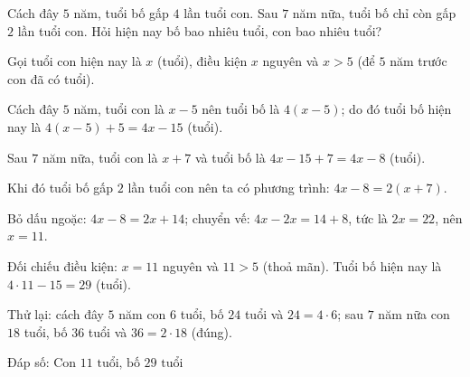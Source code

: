 \begin{problem}[8DS-PT1-044]
Cách đây $5$ năm, tuổi bố gấp $4$ lần tuổi con. Sau $7$ năm nữa, tuổi bố chỉ còn gấp $2$ lần tuổi con. Hỏi hiện nay bố bao nhiêu tuổi, con bao nhiêu tuổi?

\begin{solution}
Gọi tuổi con hiện nay là $x$ (tuổi), điều kiện $x$ nguyên và $x > 5$ (để $5$ năm trước con đã có tuổi).

Cách đây $5$ năm, tuổi con là $x - 5$ nên tuổi bố là $4(x - 5)$; do đó tuổi bố hiện nay là $4(x - 5) + 5 = 4x - 15$ (tuổi).

Sau $7$ năm nữa, tuổi con là $x + 7$ và tuổi bố là $4x - 15 + 7 = 4x - 8$ (tuổi).

Khi đó tuổi bố gấp $2$ lần tuổi con nên ta có phương trình: $4x - 8 = 2(x + 7)$.

Bỏ dấu ngoặc: $4x - 8 = 2x + 14$; chuyển vế: $4x - 2x = 14 + 8$, tức là $2x = 22$, nên $x = 11$.

Đối chiếu điều kiện: $x = 11$ nguyên và $11 > 5$ (thoả mãn). Tuổi bố hiện nay là $4 \cdot 11 - 15 = 29$ (tuổi).

Thử lại: cách đây $5$ năm con $6$ tuổi, bố $24$ tuổi và $24 = 4 \cdot 6$; sau $7$ năm nữa con $18$ tuổi, bố $36$ tuổi và $36 = 2 \cdot 18$ (đúng).

Đáp số: $\boxed{\text{Con } 11 \text{ tuổi, bố } 29 \text{ tuổi}}$
\end{solution}
\end{problem}

